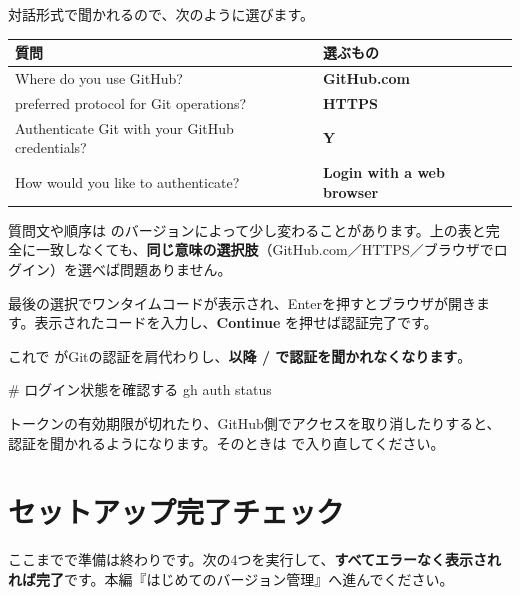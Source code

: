 対話形式で聞かれるので、次のように選びます。

\begin{center}
\begin{tabularx}{\linewidth}{@{}l X@{}}
\toprule
質問 & 選ぶもの \\
\midrule
Where do you use GitHub? & \textbf{GitHub.com} \\
preferred protocol for Git operations? & \textbf{HTTPS} \\
Authenticate Git with your GitHub credentials? & \textbf{Y} \\
How would you like to authenticate? & \textbf{Login with a web browser} \\
\bottomrule
\end{tabularx}
\end{center}

質問文や順序は  のバージョンによって少し変わることがあります。上の表と完全に一致しなくても、\textbf{同じ意味の選択肢}（GitHub.com／HTTPS／ブラウザでログイン）を選べば問題ありません。

最後の選択でワンタイムコードが表示され、Enterを押すとブラウザが開きます。表示されたコードを入力し、\textbf{Continue} を押せば認証完了です。


これで  がGitの認証を肩代わりし、\textbf{以降  /  で認証を聞かれなくなります}。

\begin{codebox}[bash]
\begin{code}
# ログイン状態を確認する
gh auth status
\end{code}
\end{codebox}

\begin{warnbox}
トークンの有効期限が切れたり、GitHub側でアクセスを取り消したりすると、認証を聞かれるようになります。そのときは  で入り直してください。
\end{warnbox}


\section{セットアップ完了チェック}

ここまでで準備は終わりです。次の4つを実行して、\textbf{すべてエラーなく表示されれば完了}です。本編『はじめてのバージョン管理』へ進んでください。

